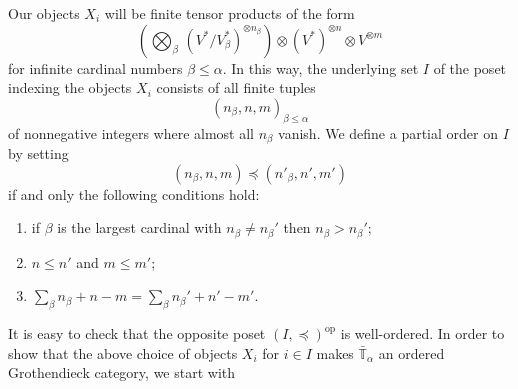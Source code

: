 \documentclass[11pt]{article}
\renewcommand{\labelenumi}{(\arabic{enumi})}
\theoremstyle{plain}
\theoremstyle{nonumberplain}
\theoremstyle{plain}
\theoremstyle{nonumberplain}
\newcommand\bT{\mathbb T}
\begin{document}
Our objects $X_i$ will be {finite} tensor products of the form
\begin{equation}\label{eq:xi}
  { \left(\bigotimes_{\beta} \,\left(V^*/V^*_{\beta}\right)^{\otimes n_\beta}\right)\otimes (V^*)^{\otimes n}\otimes V^{\otimes m}}
\end{equation}
for infinite cardinal numbers $\beta\le\alpha$.  {In this way,} the
underlying set $I$ of the poset indexing the objects $X_i$ consists of
all finite tuples
\begin{equation*}
  (n_\beta,n,{m})_{\beta\le \alpha}
\end{equation*}
of nonnegative integers where almost all $n_\beta$ vanish.  We define a partial order on $I$ by setting
\begin{equation*}
  (n_\beta,n,{m}) {\preceq} (n'_\beta,n',{m'})
\end{equation*}
{if and only the following conditions hold:}
\begin{enumerate}
  \renewcommand{\labelenumi}{(\alph{enumi})}
    \item if $\beta$ is the largest cardinal {with} $n_\beta\ne n_\beta'$ then $n_\beta>n_\beta'$;
    \item $n\le n'$  and {$m\le m'$};
    \item {$\sum_\beta n_\beta+n-m = \sum_\beta n_\beta'+n'-m'$}.
\end{enumerate}



It is easy to check that the opposite poset $(I,\preceq)^{\text{op}}$ is well-ordered.   In order to show that the above choice of objects $X_i$ for $i\in I$ makes $\bar{\bT}_\alpha$ an ordered Grothendieck category, we start with
\end{document}
